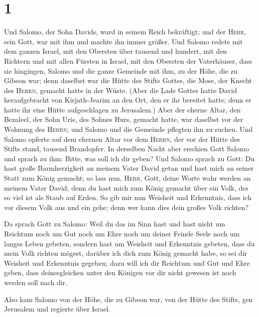 \hypertarget{section}{%
\section{1}\label{section}}

 Und Salomo, der Sohn Davids, ward in seinem Reich
bekräftigt; und der \textsc{Herr}, sein Gott, war mit ihm und machte ihn
immer größer.  Und Salomo redete mit dem ganzen Israel,
mit den Obersten über tausend und hundert, mit den Richtern und mit
allen Fürsten in Israel, mit den Obersten der Vaterhäuser,
 dass sie hingingen, Salomo und die ganze Gemeinde mit
ihm, zu der Höhe, die zu Gibeon war; denn daselbst war die Hütte des
Stifts Gottes, die Mose, der Knecht des \textsc{Herrn}, gemacht hatte in
der Wüste.  (Aber die Lade Gottes hatte David
heraufgebracht von Kirjath-Jearim an den Ort, den er ihr bereitet hatte;
denn er hatte ihr eine Hütte aufgeschlagen zu Jerusalem.) 
Aber der eherne Altar, den Bezaleel, der Sohn Uris, des Sohnes Hurs,
gemacht hatte, war daselbst vor der Wohnung des \textsc{Herrn}; und
Salomo und die Gemeinde pflegten ihn zu suchen.  Und
Salomo opferte auf dem ehernen Altar vor dem \textsc{Herrn}, der vor der
Hütte des Stifts stand, tausend Brandopfer.  In derselben
Nacht aber erschien Gott Salomo und sprach zu ihm: Bitte, was soll ich
dir geben?  Und Salomo sprach zu Gott: Du hast große
Barmherzigkeit an meinem Vater David getan und hast mich an seiner Statt
zum König gemacht;  so lass nun, \textsc{Herr}, Gott,
deine Worte wahr werden an meinem Vater David; denn du hast mich zum
König gemacht über ein Volk, des so viel ist als Staub auf Erden.
 So gib mir nun Weisheit und Erkenntnis, dass ich vor
diesem Volk aus und ein gehe; denn wer kann dies dein großes Volk
richten?

 Da sprach Gott zu Salomo: Weil du das im Sinn hast und
hast nicht um Reichtum noch um Gut noch um Ehre noch um deiner Feinde
Seele noch um langes Leben gebeten, sondern hast um Weisheit und
Erkenntnis gebeten, dass du mein Volk richten mögest, darüber ich dich
zum König gemacht habe,  so sei dir Weisheit und
Erkenntnis gegeben; dazu will ich dir Reichtum und Gut und Ehre geben,
dass deinesgleichen unter den Königen vor dir nicht gewesen ist noch
werden soll nach dir.

 Also kam Salomo von der Höhe, die zu Gibeon war, von der
Hütte des Stifts, gen Jerusalem und regierte über Israel.


